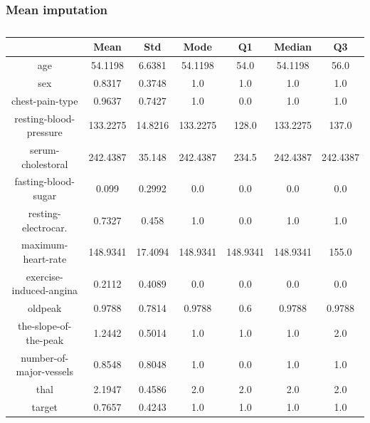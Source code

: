 \documentclass{classrep}
\begin{document}
{{            \subsubsection{Mean imputation}
            \label{results:45-percent:mean-input} {
                \begin{table}[!htbp]
                    \centering
                    \begin{tabular}{|c|c|c|c|c|c|c|}
                        \hline
                        & Mean & Std & Mode & Q1 & Median & Q3 \\ \hline
                        age & 54.1198 & 6.6381 & 54.1198 & 54.0 & 54.1198 & 56.0 \\ \hline
                        sex & 0.8317 & 0.3748 & 1.0 & 1.0 & 1.0 & 1.0 \\ \hline
                        chest-pain-type & 0.9637 & 0.7427 & 1.0 & 0.0 & 1.0 & 1.0 \\ \hline
                        resting-blood-pressure & 133.2275 & 14.8216 & 133.2275 & 128.0 & 133.2275 & 137.0 \\ \hline
                        serum-cholestoral & 242.4387 & 35.148 & 242.4387 & 234.5 & 242.4387 & 242.4387 \\ \hline
                        fasting-blood-sugar & 0.099 & 0.2992 & 0.0 & 0.0 & 0.0 & 0.0 \\ \hline
                        resting-electrocar. & 0.7327 & 0.458 & 1.0 & 0.0 & 1.0 & 1.0 \\ \hline
                        maximum-heart-rate & 148.9341 & 17.4094 & 148.9341 & 148.9341 & 148.9341 & 155.0 \\ \hline
                        exercise-induced-angina & 0.2112 & 0.4089 & 0.0 & 0.0 & 0.0 & 0.0 \\ \hline
                        oldpeak & 0.9788 & 0.7814 & 0.9788 & 0.6 & 0.9788 & 0.9788 \\ \hline
                        the-slope-of-the-peak & 1.2442 & 0.5014 & 1.0 & 1.0 & 1.0 & 2.0 \\ \hline
                        number-of-major-vessels & 0.8548 & 0.8048 & 1.0 & 0.0 & 1.0 & 1.0 \\ \hline
                        thal & 2.1947 & 0.4586 & 2.0 & 2.0 & 2.0 & 2.0 \\ \hline
                        target & 0.7657 & 0.4243 & 1.0 & 1.0 & 1.0 & 1.0 \\ \hline
                    \end{tabular}
                    \caption{}
                    \label{result_45_Mean-imputation}
                \end{table}
                \FloatBarrier

}}}
\end{document}
